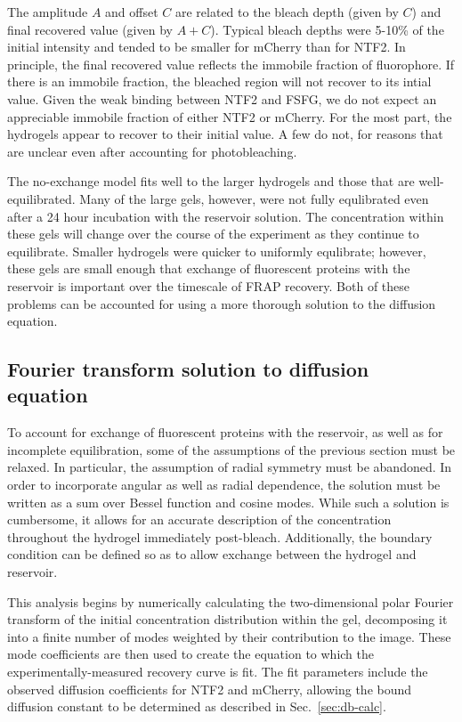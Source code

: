 The amplitude $A$ and offset $C$ are related to the bleach depth (given by $C$) and final recovered value (given by $A+C$).  Typical bleach depths were 5-10\% of the initial intensity and tended to be smaller for mCherry than for NTF2.  In principle, the final recovered value reflects the immobile fraction of fluorophore.  If there is an immobile fraction, the bleached region will not recover to its intial value.  Given the weak binding between NTF2 and FSFG, we do not expect an appreciable immobile fraction of either NTF2 or mCherry.  For the most part, the hydrogels appear to recover to their initial value.  A few do not, for reasons that are unclear even after accounting for photobleaching.

The no-exchange model fits well to the larger hydrogels and those that are well-equilibrated.  Many of the large gels, however, were not fully equlibrated even after a 24 hour incubation with the reservoir solution.  The concentration within these gels will change over the course of the experiment as they continue to equilibrate.  Smaller hydrogels were quicker to uniformly equlibrate; however, these gels are small enough that exchange of fluorescent proteins with the reservoir is important over the timescale of FRAP recovery.  Both of these problems can be accounted for using a more thorough solution to the diffusion equation.

\subsection{Fourier transform solution to diffusion equation}

To account for exchange of fluorescent proteins with the reservoir, as well as for incomplete equilibration, some of the assumptions of the previous section must be relaxed.  In particular, the assumption of radial symmetry must be abandoned.  In order to incorporate angular as well as radial dependence, the solution must be written as a sum over Bessel function and cosine modes.  While such a solution is cumbersome, it allows for an accurate description of the concentration throughout the hydrogel immediately post-bleach.  Additionally, the boundary condition can be defined so as to allow exchange between the hydrogel and reservoir.

This analysis begins by numerically calculating the two-dimensional polar Fourier transform of the initial concentration distribution within the gel, decomposing it into a finite number of modes weighted by their contribution to the image.  These mode coefficients are then used to create the equation to which the experimentally-measured recovery curve is fit.  The fit parameters include the observed diffusion coefficients for NTF2 and mCherry, allowing the bound diffusion constant to be determined as described in Sec.~\ref{sec:db-calc}.

